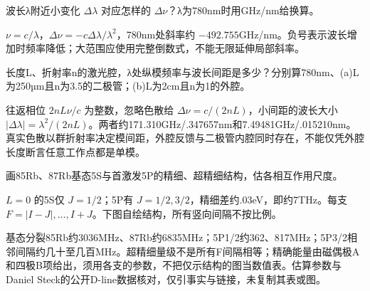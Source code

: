 \begin{exercise}\label{task:exp48-1}
波长λ附近小变化 $\Delta\lambda$ 对应怎样的 $\Delta\nu$？λ为780nm时用GHz/nm给换算。
\end{exercise}
\begin{solution}
$\nu=c/\lambda$，$\Delta\nu=-c\Delta\lambda/\lambda^2$，780nm处斜率约 $-492.755$GHz/nm。负号表示波长增加时频率降低；大范围应使用完整倒数式，不能无限延伸局部斜率。
\end{solution}
\begin{exercise}\label{task:exp48-2}
长度L、折射率n的激光腔，λ处纵模频率与波长间距是多少？分别算780nm、(a)L为250µm且n为3.5的二极管；(b)L为2cm且n为1的外腔。
\end{exercise}
\begin{solution}
往返相位 $2nL\nu/c$ 为整数，忽略色散给 $\Delta\nu=c/(2nL)$，小间距的波长大小 $|\Delta\lambda|=\lambda^2/(2nL)$。两者约171.310GHz/.347657nm和7.49481GHz/.015210nm。真实色散以群折射率决定模间距，外腔反馈与二极管内腔同时存在，不能仅凭外腔长度断言任意工作点都是单模。
\end{solution}
\begin{exercise}\label{task:exp48-3}
画85Rb、87Rb基态5S与首激发5P的精细、超精细结构，估各相互作用尺度。
\end{exercise}
\begin{solution}
$L=0$ 的5S仅 $J=1/2$；5P有 $J=1/2,3/2$，精细差约.03eV，即约7THz。每支 $F=|I-J|,\ldots,I+J$。下图自绘结构，所有竖向间隔不按比例。
\begin{center}\end{center}
基态分裂85Rb约3036MHz、87Rb约6835MHz；5P1/2约362、817MHz；5P3/2相邻间隔约几十至几百MHz。超精细量级不是所有F间隔相等；精确能量由磁偶极A和四极B项给出，须用各支的参数，不把仅示结构的图当数值表。估算参数与Daniel Steck的公开D-line数据核对，仅引事实与链接，未复制其表或图。
\end{solution}
